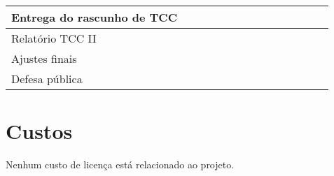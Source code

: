 {\begin{tabular}{|X p{5cm}|c|c|c|c|c|c|c|c|c|c|c|c|}
		\hiderowcolors Entrega do rascunho de TCC                                &                        &                        &                        &                        &                        &                        &                        &                        &                        & \cellcolor{shadecolor} &                        &                        \\ \hline

		\hiderowcolors Relatório TCC II                                          &                        &                        &                        &                        &                        &                        &                        &                        &                        & \cellcolor{shadecolor} & \cellcolor{shadecolor} &
		\\ \hline

		\hiderowcolors Ajustes finais                                            &                        &                        &                        &                        &                        &                        &                        &                        &                        &                        & \cellcolor{shadecolor} &                        \\ \hline

		\hiderowcolors Defesa pública                                            &                        &                        &                        &                        &                        &                        &                        &                        &                        &                        &                        & \cellcolor{shadecolor} \\ \hline
	\end{tabular}
}

\section{Custos}

Nenhum custo de licença está relacionado ao projeto.
\\

